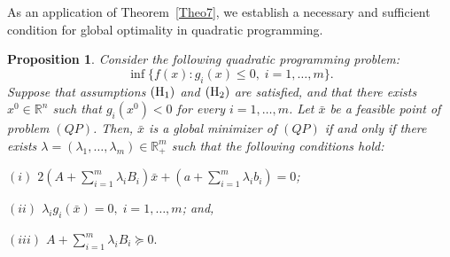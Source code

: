 \documentclass[]{interact}
\theoremstyle{plain}%
\newtheorem{proposition}[theorem]{Proposition}
\theoremstyle{definition}
\theoremstyle{remark}
\begin{document}
	
	As an application of Theorem~\ref{Theo7}, we establish a necessary and sufficient
	condition for global optimality in quadratic programming.
	
	\begin{proposition}\label{pro1}
		Consider the following quadratic programming problem:
		\begin{equation}\tag{$QP$}
			\inf\{f(x): g_i(x)\leq 0,\; i=1, \ldots, m\}.
		\end{equation}
		Suppose that assumptions $({\rm H_1})$ and $({\rm H_2})$ are satisfied, and that there exists
		$x^0\in \mathbb{R}^n$ such that $g_i(x^0)<0$ for every $i=1, \ldots, m$.
		Let $\bar x$ be a feasible point of problem $(QP)$.
		Then, $\bar x$ is a global minimizer of $(QP)$ if and only if there exists
		$\lambda=(\lambda_1,\ldots,\lambda_m)\in \mathbb{R}^m_+$ such that the following conditions hold:
		\begin{description}
			\item{$(i)$} $2(A+\sum_{i=1}^{m}\lambda_iB_i)\bar x+ (a+\sum_{i=1}^{m}\lambda_ib_i)=0$;
			\item{$(ii)$} $\lambda_ig_i(\bar x)=0, \; i=1, \ldots,m$; and,
			\item{$(iii)$} $A+\sum_{i=1}^{m}\lambda_iB_i\succeq 0.$
		\end{description}
	\end{proposition}
\end{document}
